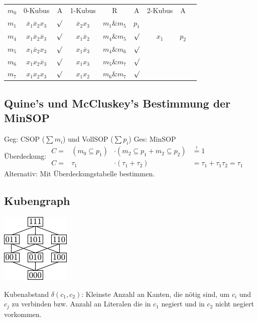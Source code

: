 \documentclass[6pt,a4paper]{scrartcl}
\begin{document}
\begin{multicols}{3}
\begin{tabular}{l | c | c  || c | c | c || c | c | r}
$m_0$ & 0-Kubus & A & 1-Kubus & R & A & 2-Kubus  & A \\
$m_1$ & $\overline x_1 \overline x_2 x_3$ & $\surd$ & $\overline x_2 x_3$ & $m_1 \& m_5$ & $p_1$ & &\\
$m_4$ & $x_1 \overline x_2 \overline x_3$ & $\surd$ & $x_1 \overline x_2$ & $m_4 \& m_5$ & $\surd$ & $x_1$ &   $p_2$\\
$m_5$ & $x_1 \overline x_2  x_3$ & $\surd$  & $x_1 \overline x_3$ & $m_4 \& m_6$ & $\surd$& &\\
$m_6$ & $x_1 x_2 \overline x_3$ & $ \surd$ & $x_1 x_3$ & $ m_5 \& m_7$ & $ \surd$ & &\\
$m_7$ & $x_1 x_2 x_3$ & $\surd$ & $x_1 x_2$ & $m_6 \& m_7 $ & $ \surd$ & &\\
\end{tabular}

	\subsection{Quine's und McCluskey's Bestimmung der MinSOP}
	Geg: CSOP ($\sum m_i$) und VollSOP ($\sum p_i$) \qquad Ges: MinSOP\\
	Überdeckung: $\begin{array}{rccl} C = & (m_0 \subseteq p_1) & \cdot (m_2 \subseteq p_1 + m_2 \subseteq p_2) & \stackrel{!}=1 \\ C = & \tau_1 & \cdot (\tau_1 + \tau_2) & = \tau_1 + \tau_1 \tau_2 = \tau_1 \end{array}$ \\
	Alternativ: Mit Überdeckungstabelle bestimmen.

	\subsection{Kubengraph}
	\parbox{3.0cm}{\includegraphics{./img/ds/kubengraph.pdf} }
	\parbox{6.0cm}{Kubenabstand $\delta(c_1, c_2)$: Kleinste Anzahl an Kanten, die nötig sind, um $c_i$ und $c_j$ zu verbinden bzw.
	Anzahl an Literalen die in $c_1$ negiert und in $c_2$ nicht negiert vorkommen.\\
	
}
\end{multicols}
\end{document}
